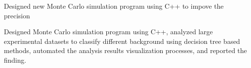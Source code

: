 \documentclass[letterpaper]{deedy-resume-openfont}
\begin{document}
\begin{tightemize}
\item Designed new Monte Carlo simulation program using C++ to impove the precision 
\item Designed Monte Carlo simulation program using C++, analyzed large experimental datasets to classify different background using decision tree based methods, automated the analysis results visualization processes, and reported the finding.

\end{tightemize}
\sectionsep
\end{document}
